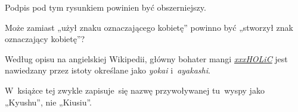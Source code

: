 \documentclass[a4paper,11pt]{article}
\begin{document}
\vspace{\spaceFour}



\start {} Podpis pod tym rysunkiem powinien być obszerniejszy.

\vspace{\spaceFour}



\start {} Może zamiast „użył znaku oznaczającego
kobietę” powinno być „stworzył znak oznaczający kobietę”?

\vspace{\spaceFour}



\start {} Według opisu na angielskiej Wikipedii, główny
bohater mangi
\href{https://en.wikipedia.org/wiki/XxxHolic}{\textit{xxxHOLiC}} jest
nawiedzany przez istoty określane jako \textit{yokai}
i~\textit{ayakashi}.

\vspace{\spaceFour}



\start {} W~książce tej zwykle zapisuje~się nazwę przywoływanej
tu~wyspy jako „Kyushu”, %
nie „Kiusiu”.





\end{document}

